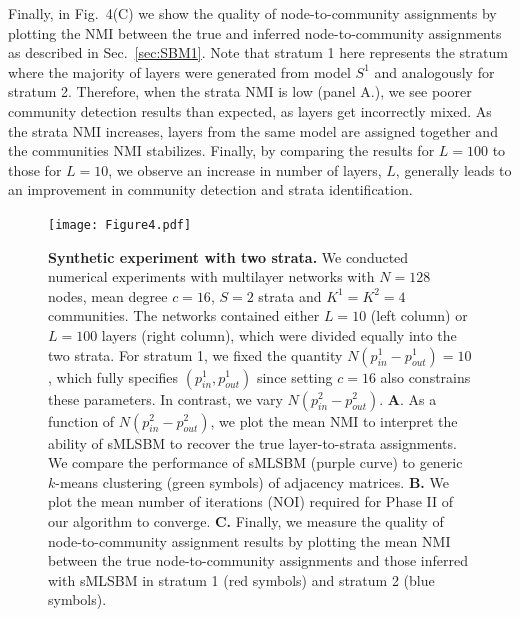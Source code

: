 {%
%
Finally, in Fig.~4(C) we show the quality of node-to-community assignments 
by plotting the NMI between the true and inferred node-to-community assignments as described in Sec.~\ref{sec:SBM1}. Note that stratum 1 here represents the stratum where the majority of layers were generated from model $S^{1}$ and analogously for stratum 2. Therefore, when the strata NMI is low (panel A.), we see poorer community detection results than expected, as layers get incorrectly mixed. As the strata NMI increases, layers from the same model are assigned together and the communities NMI stabilizes. 
Finally, by comparing the results for $L=100$ to those for $L=10$, we observe an increase in number of layers, $L$, generally leads to an improvement in community detection and strata identification.\\


\begin{figure}
\begin{center}
\texttt{[image: Figure4.pdf]}
\label{fig:saray}
\caption{
{\bf Synthetic experiment with two strata.} We conducted numerical experiments with multilayer networks with $N=128$ nodes, mean degree $c=16$, $S=2$ strata and $K^1=K^2=4$ communities. The networks contained either $L=10$ (left column) or $L=100$ layers (right column), which were divided equally into the two strata. For stratum 1, we fixed the quantity $N(p_{{in}}^{1}-p_{{out}}^{1})=10$, which fully specifies $(p_{{in}}^{1},p_{{out}}^{1})$ since setting $c=16$ also constrains these parameters. In contrast, we vary $N(p_{{in}}^{2}-p_{{out}}^{2})$.
%
{\bf A}. As a function of $N(p_{{in}}^{2}-p_{{out}}^{2})$, we plot the mean NMI to interpret the ability of sMLSBM to recover the true layer-to-strata assignments. We compare the performance of sMLSBM (purple curve) to generic $k$-means clustering (green symbols) of adjacency matrices. 
{\bf B.} We plot the mean number of iterations (NOI) required for Phase II of our algorithm to converge.
{\bf C.} Finally, we measure the quality of node-to-community assignment results by plotting the mean NMI between the true node-to-community assignments and those inferred with sMLSBM in stratum 1 (red symbols) and stratum 2 (blue symbols).}


\end{center}
\end{figure}}
